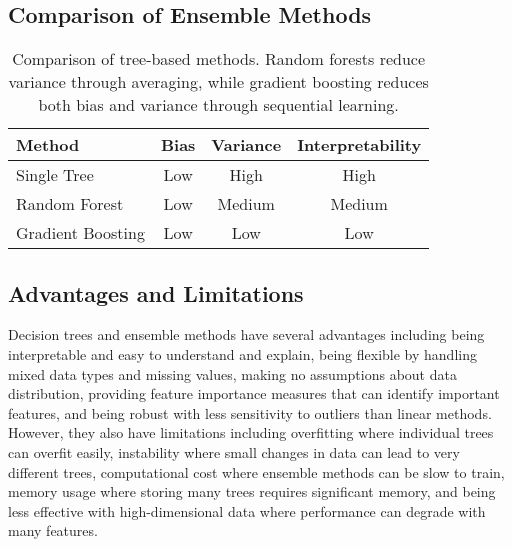 \subsection{Comparison of Ensemble Methods}

\begin{table}[htbp]
\centering
\begin{tabular}{lccc}
\toprule
Method & Bias & Variance & Interpretability \\
\midrule
Single Tree & Low & High & High \\
Random Forest & Low & Medium & Medium \\
Gradient Boosting & Low & Low & Low \\
\bottomrule
\end{tabular}
\caption{Comparison of tree-based methods. Random forests reduce variance through averaging, while gradient boosting reduces both bias and variance through sequential learning.}
\label{tab:ensemble-comparison}
\end{table}

\subsection{Advantages and Limitations}

Decision trees and ensemble methods have several advantages including being interpretable and easy to understand and explain, being flexible by handling mixed data types and missing values, making no assumptions about data distribution, providing feature importance measures that can identify important features, and being robust with less sensitivity to outliers than linear methods. However, they also have limitations including overfitting where individual trees can overfit easily, instability where small changes in data can lead to very different trees, computational cost where ensemble methods can be slow to train, memory usage where storing many trees requires significant memory, and being less effective with high-dimensional data where performance can degrade with many features.

